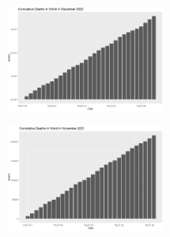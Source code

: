 \documentclass[a4paper]{article}
\theoremstyle{definition}
\begin{document}
\begin{enumerate}[i)]
\begin{enumerate}[1]
		\begin{figure} [!htp]
  		\centering
  		\includegraphics [width=0.47\textwidth] {Images/wrl_deaths_2}
		\end{figure}
		\begin{figure} [!htp]
  		\centering
  		\includegraphics [width=0.47\textwidth] {Images/wrl_deaths_3}
		\end{figure}
		

\end{enumerate}
\end{enumerate}
\end{document}
